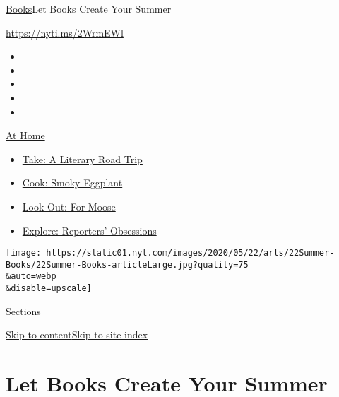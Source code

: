 \href{/section/books}{Books}\textbar{}Let Books Create Your Summer

\url{https://nyti.ms/2WrmEWl}

\begin{itemize}
\item
\item
\item
\item
\item
\end{itemize}

\href{https://www.nytimes.com/spotlight/at-home?action=click\&pgtype=Article\&state=default\&region=TOP_BANNER\&context=at_home_menu}{At
Home}

\begin{itemize}
\tightlist
\item
  \href{https://www.nytimes.com/2020/07/28/books/time-for-a-literary-road-trip.html?action=click\&pgtype=Article\&state=default\&region=TOP_BANNER\&context=at_home_menu}{Take:
  A Literary Road Trip}
\item
  \href{https://www.nytimes.com/2020/07/29/magazine/bored-with-your-home-cooking-some-smoky-eggplant-will-fix-that.html?action=click\&pgtype=Article\&state=default\&region=TOP_BANNER\&context=at_home_menu}{Cook:
  Smoky Eggplant}
\item
  \href{https://www.nytimes.com/2020/07/27/travel/moose-michigan-isle-royale.html?action=click\&pgtype=Article\&state=default\&region=TOP_BANNER\&context=at_home_menu}{Look
  Out: For Moose}
\item
  \href{https://www.nytimes.com/interactive/2020/at-home/even-more-reporters-editors-diaries-lists-recommendations.html?action=click\&pgtype=Article\&state=default\&region=TOP_BANNER\&context=at_home_menu}{Explore:
  Reporters' Obsessions}
\end{itemize}

\texttt{[image: https://static01.nyt.com/images/2020/05/22/arts/22Summer-Books/22Summer-Books-articleLarge.jpg?quality=75\\\&auto=webp\\\&disable=upscale]}

Sections

\protect\hyperlink{site-content}{Skip to
content}\protect\hyperlink{site-index}{Skip to site index}

\hypertarget{let-books-create-your-summer}{%
\section{Let Books Create Your
Summer}\label{let-books-create-your-summer}}

